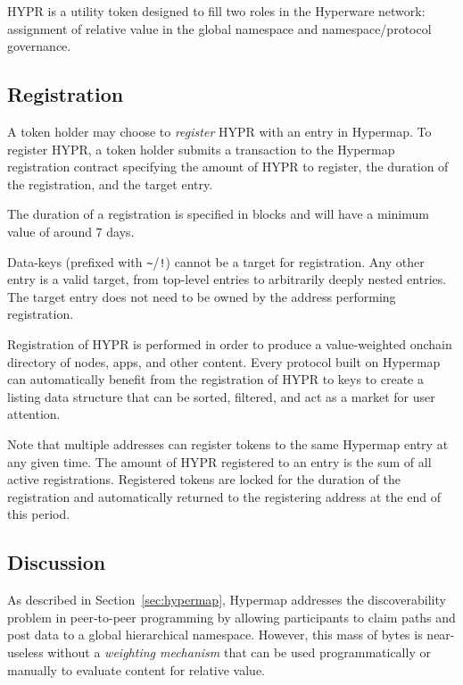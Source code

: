 \documentclass[runningheads]{llncs}
\begin{document}
HYPR is a utility token designed to fill two roles in the Hyperware network: assignment of relative value in the global namespace and namespace/protocol governance.

\subsection{Registration}
\label{sec:hyprregister}

A token holder may choose to \textit{register} HYPR with an entry in Hypermap.
To register HYPR, a token holder submits a transaction to the Hypermap registration contract specifying the amount of HYPR to register, the duration of the registration, and the target entry.

The duration of a registration is specified in blocks and will have a minimum value of around 7 days.

Data-keys (prefixed with \verb|~|/\verb|!|) cannot be a target for registration.
Any other entry is a valid target, from top-level entries to arbitrarily deeply nested entries.
The target entry does not need to be owned by the address performing registration.

Registration of HYPR is performed in order to produce a value-weighted onchain directory of nodes, apps, and other content.
Every protocol built on Hypermap can automatically benefit from the registration of HYPR to keys to create a listing data structure that can be sorted, filtered, and act as a market for user attention.

Note that multiple addresses can register tokens to the same Hypermap entry at any given time.
The amount of HYPR registered to an entry is the sum of all active registrations.
Registered tokens are locked for the duration of the registration and automatically returned to the registering address at the end of this period.

\subsection{Discussion}
\label{sec:hyprdiscussion}

As described in Section~\ref{sec:hypermap}, Hypermap addresses the discoverability problem in peer-to-peer programming by allowing participants to claim paths and post data to a global hierarchical namespace.
However, this mass of bytes is near-useless without a \textit{weighting mechanism} that can be used programmatically or manually to evaluate content for relative value.
\end{document}
